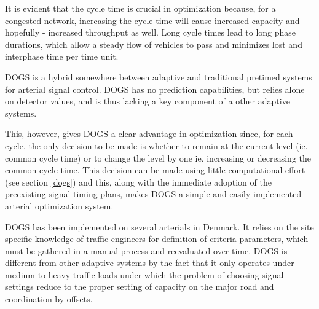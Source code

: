It is evident that the cycle time is crucial in optimization because, for a congested network, increasing the cycle time will cause increased capacity and - hopefully - increased throughput as well. Long cycle times lead to long phase durations, which allow a steady flow of vehicles to pass and minimizes lost and interphase time per time unit.

DOGS is a hybrid somewhere between adaptive and traditional pretimed systems for arterial signal control. DOGS has no prediction capabilities, but relies alone on detector values, and is thus lacking a key component of a other adaptive systems. 

This, however, gives DOGS a clear advantage in optimization since, for each cycle, the only decision to be made is whether to remain at the current level (ie. common cycle time) or to change the level by one ie. increasing or decreasing the common cycle time. This decision can be made using little computational effort (see section \ref{dogs}) and this, along with the immediate adoption of the preexisting signal timing plans, makes DOGS a simple and easily implemented arterial optimization system.

DOGS has been implemented on several arterials in Denmark. It relies on the site specific knowledge of traffic engineers for definition of criteria parameters, which must be gathered in a manual process and reevaluated over time. DOGS is different from other adaptive systems by the fact that it only operates under medium to heavy traffic loads under which the problem of choosing signal settings reduce to the proper setting of capacity on the major road and coordination by offsets.